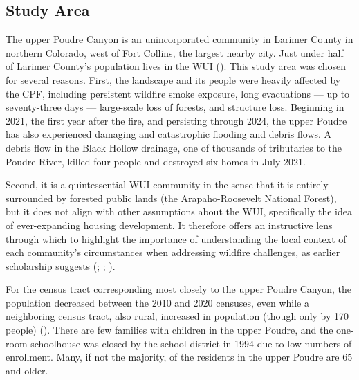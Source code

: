\documentclass[
]{article}
\begin{document}
\subsection{Study Area}\label{study-area}

The upper Poudre Canyon is an unincorporated community in Larimer County in northern Colorado, west of Fort Collins, the largest nearby city. Just under half of Larimer County's population lives in the WUI (). This study area was chosen for several reasons. First, the landscape and its people were heavily affected by the CPF, including persistent wildfire smoke exposure, long evacuations --- up to seventy-three days --- large-scale loss of forests, and structure loss. Beginning in 2021, the first year after the fire, and persisting through 2024, the upper Poudre has also experienced damaging and catastrophic flooding and debris flows. A debris flow in the Black Hollow drainage, one of thousands of tributaries to the Poudre River, killed four people and destroyed six homes in July 2021.

Second, it is a quintessential WUI community in the sense that it is entirely surrounded by forested public lands (the Arapaho-Roosevelt National Forest), but it does not align with other assumptions about the WUI, specifically the idea of ever-expanding housing development. It therefore offers an instructive lens through which to highlight the importance of understanding the local context of each community's circumstances when addressing wildfire challenges, as earlier scholarship suggests (; ; ).

For the census tract corresponding most closely to the upper Poudre Canyon, the population decreased between the 2010 and 2020 censuses, even while a neighboring census tract, also rural, increased in population (though only by 170 people) (). There are few families with children in the upper Poudre, and the one-room schoolhouse was closed by the school district in 1994 due to low numbers of enrollment. Many, if not the majority, of the residents in the upper Poudre are 65 and older.
\end{document}
